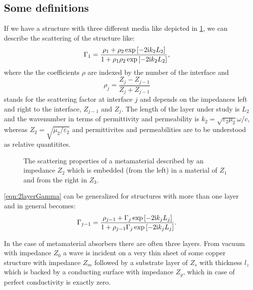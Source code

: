 \subsection{Some definitions}

If we have a structure with three different media like depicted in \cref{fig:stacked_structure}, we can describe the scattering of the structure like:
\begin{equation}
\Gamma_1 = \frac{\rho_1+\rho_2 \exp\left[-2\mathrm{i} k_2 L_2\right]}
{1+\rho_1\rho_2 \exp\left[-2\mathrm{i} k_2 L_2\right]},
\label{eqn:2layerGamma}
\end{equation}
where the the coefficients $\rho$ are indexed by the number of the interface and 
\begin{equation}
\rho_j = \frac{Z_j - Z_{j-1} }{Z_j + Z_{j-1} }
\label{eqn:rho}
\end{equation}
stands for the scattering factor at interface $j$ and depends on the impedances left and right to the interface, 
$Z_{j-1}$ and $Z_j$. The length of the layer under study is $L_2$ and the wavenumber in terms of permittivity 
and permeability is $k_2=\sqrt{\varepsilon_2\mu_2} \omega/c$, whereas $Z_2=\sqrt{\mu_2/\varepsilon_2}$ and permittivites and permeabilities are to be understood as relative quantitites.


\begin{figure}
\centering
{}
\caption{The scattering properties of a metamaterial described by an impedance $Z_2$ which is embedded (from the left) in a material of $Z_1$ and from the right in $Z_3$.}
\label{fig:stacked_structure}
\end{figure}

\cref{eqn:2layerGamma} can be generalized for structures with more than one layer and in general becomes:
\begin{equation}
\Gamma_{j-1} = \frac{\rho_{j-1}+\Gamma_j \exp\left[-2\mathrm{i} k_j L_j\right]}
{1+\rho_{j-1}\Gamma_j \exp\left[-2\mathrm{i} k_j L_j\right]}.
\label{eqn:NlayerGamma}
\end{equation}

In the case of metamaterial absorbers there are often three layers. From vacuum with impedance $Z_0$ a wave is incident on a very thin sheet of some copper structure with impedance $Z_m$ followed by a substrate layer of $Z_s$ with thickness $l_z$ which is backed by a conducting surface with impedance $Z_g$, which in case of perfect conductivity is exactly zero.

